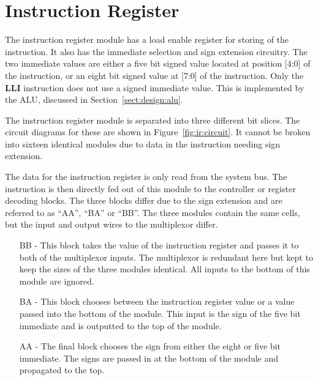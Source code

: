 
\section{Instruction Register}


The instruction register module has a load enable register for storing of the instruction.
It also has the immediate selection and sign extension circuitry.
The two immediate values are either a five bit signed value located at position [4:0] of the instruction, or an eight bit signed value at [7:0] of the instruction.
Only the \textbf{LLI} instruction does not use a signed immediate value. 
This is implemented by the ALU, discussed in Section~\ref{sect:design:alu}.


The instruction register module is separated into three different bit slices.
The circuit diagrams for these are shown in Figure~\ref{fig:ir:circuit}.
It cannot be broken into sixteen identical modules due to data in the instruction needing sign extension. 

The data for the instruction register is only read from the system bus. 
The instruction is then directly fed out of this module to the controller or register decoding blocks.
The three blocks differ due to the sign extension and are referred to as ``AA'', ``BA'' or ``BB''.
The three modules contain the same cells, but the input and output wires to the multiplexor differ. 
\begin{enumerate}
\item[BB] - This block takes the value of the instruction register and passes it to both of the multiplexor inputs. The multiplexor is redundant here but kept to keep the sizes of the three modules identical. All inputs to the bottom of this module are ignored.
\item[BA] - This block chooses between the instruction register value or a value passed into the bottom of the module. This input is the sign of the five bit immediate and is outputted to the top of the module.
\item[AA] - The final block chooses the sign from either the eight or five bit immediate. The signs are passed in at the bottom of the module and propagated to the top. 
\end{enumerate}

